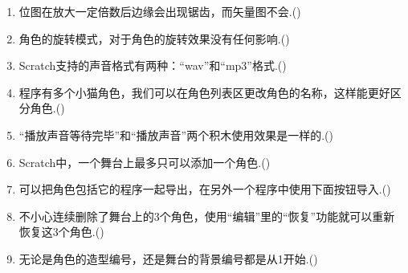 \documentclass[10pt, a4paper]{article}
\begin{document}
\begin{enumerate}
        \item 位图在放大一定倍数后边缘会出现锯齿，而矢量图不会.(\qquad)
        
        \item 角色的旋转模式，对于角色的旋转效果没有任何影响.(\qquad)
  
        \item Scratch支持的声音格式有两种：“wav”和“mp3”格式.(\qquad)
        
        \item 程序有多个小猫角色，我们可以在角色列表区更改角色的名称，这样能更好区分角色.(\qquad)
        
        \item “播放声音等待完毕”和“播放声音”两个积木使用效果是一样的.(\qquad)
        
        \item Scratch中，一个舞台上最多只可以添加一个角色.(\qquad)
        
        \item 可以把角色包括它的程序一起导出，在另外一个程序中使用下面按钮导入.(\qquad)
        
        \item 不小心连续删除了舞台上的3个角色，使用“编辑”里的“恢复”功能就可以重新恢复这3个角色.(\qquad)
        
        \item 无论是角色的造型编号，还是舞台的背景编号都是从1开始.(\qquad)
    \end{enumerate}
\end{document}
